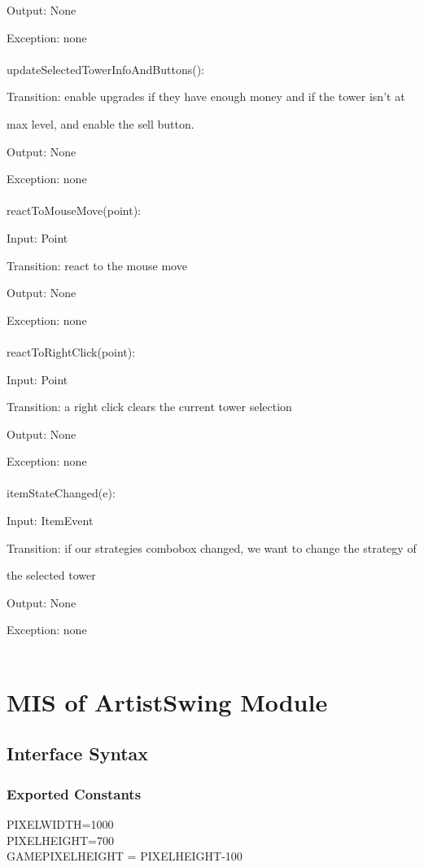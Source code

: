 \documentclass[12,english]{article}
\begin{document}
		Output: None
		
		Exception: none\\
		\\
		updateSelectedTowerInfoAndButtons():
		
		Transition: enable upgrades if they have enough money and if the tower isn't at
		
		max level, and enable the sell button.
		
		Output: None
		
		Exception: none\\
		\\
		reactToMouseMove(point):
		
		Input: Point
		
		Transition: react to the mouse move
		
		Output: None
		
		Exception: none\\
		\\
		reactToRightClick(point):
		
		Input: Point
		
		Transition: a right click clears the current tower selection
		
		Output: None
		
		Exception: none\\
		\\
		itemStateChanged(e):
		
		Input: ItemEvent
		
		Transition: if our strategies combobox changed, we want to change the strategy of
		
		the selected tower
		
		Output: None
		
		Exception: none\\
		\\
		
		
	
	
	
\section{MIS of ArtistSwing Module}
	\subsection{Interface Syntax}
	    \subsubsection{Exported Constants}
	    PIXELWIDTH=1000\\
	    PIXELHEIGHT=700\\
	    GAMEPIXELHEIGHT = PIXELHEIGHT-100\\
\end{document}
